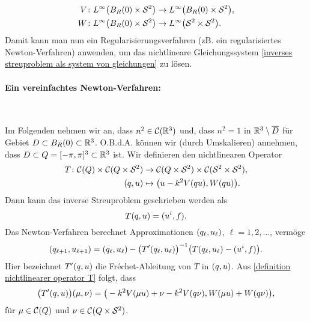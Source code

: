 \begin{align}
	\label{betrachtung von V als beschränkter linearer operator}
	{V}\colon{L^\infty\big(B_R(0)\times\mathcal{S}^2\big)}&\to{L^\infty\big(B_R(0)\times\mathcal{S}^2\big)},\\
	\label{betrachtung von W als beschränkter linearer operator}
	{W}\colon{L^\infty\big(B_R(0)\times\mathcal{S}^2\big)}&\to{L^\infty\big(\mathcal{S}^2\times\mathcal{S}^2\big)}.
\end{align}
Damit kann man nun ein Regularisierungsverfahren (zB. ein regularisiertes Newton-Verfahren) anwenden, um das nichtlineare Gleichungssystem \eqref{inverses streuproblem als system von gleichungen} zu lösen.

\paragraph{Ein vereinfachtes Newton-Verfahren:}\

Im Folgenden nehmen wir an, dass \(n^2\in\mathcal{C}(\mathbb{R}^3)\) und, dass \(n^2=1\) in \(\mathbb{R}^3\setminus\overline{D}\) für Gebiet \(D\subset B_R(0)\subset\mathbb{R}^3\). O.B.d.A. können wir (durch Umskalieren) annehmen, dass \(D\subset Q=[-\pi,\pi]^3\subset\mathbb{R}^3\) ist. Wir definieren den nichtlinearen Operator
\begin{equation}
	\label{definition nichtlinearer operator T}
	\begin{aligned}
		{T}\colon{\mathcal{C}(Q)\times\mathcal{C}(Q\times\mathcal{S}^2)}&\to{\mathcal{C}(Q\times\mathcal{S}^2)\times\mathcal{C}(\mathcal{S}^2\times\mathcal{S}^2)},\\
		(q,u)&\mapsto\big(u-k^2V(q u),W(q u)\big).
	\end{aligned}
\end{equation}
Dann kann das inverse Streuproblem geschrieben werden als
\begin{equation*}
	T(q,u)=(u^i,f).
\end{equation*}
Das Newton-Verfahren berechnet Approximationen \((q_\ell,u_\ell)\), \(\ell=1,2,\ldots\), vermöge
\begin{equation}
	\label{iterative darstellung von tupel (kontrast_l,u_l)}
	(q_{\ell+1},u_{\ell+1})
	=(q_\ell,u_\ell)
	-\big(T'(q_\ell,u_\ell)\big)^{-1}\big(T(q_\ell,u_\ell)-(u^i,f)\big).
\end{equation}
Hier bezeichnet \(T'(q,u)\) die Fréchet-Ableitung von \(T\) in \((q,u)\). Aus \eqref{definition nichtlinearer operator T} folgt, dass
\begin{equation}
	\label{frechet ableitung von nichtlin operator T}
	\big(T'(q,u)\big)(\mu,\nu) = \big( -k^2V(\mu u)+\nu-k^2V(q\nu), W(\mu u)+W(q\nu) \big),
\end{equation}
für \(\mu\in\mathcal{C}(Q)\) und \(\nu\in\mathcal{C}(Q\times\mathcal{S}^2)\).\vspace{2mm}

